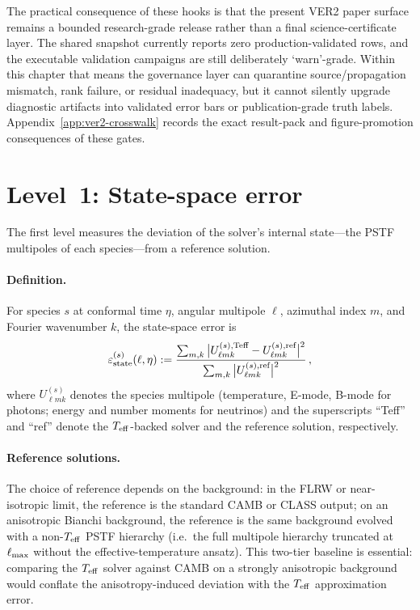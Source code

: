 The practical consequence of these hooks is that the present VER2 paper
surface remains a bounded research-grade release rather than a final
science-certificate layer.  The shared snapshot currently reports zero
production-validated rows, and the executable validation campaigns are
still deliberately `warn'-grade.  Within this chapter that means the
governance layer can quarantine source/propagation mismatch, rank
failure, or residual inadequacy, but it cannot silently upgrade
diagnostic artifacts into validated error bars or publication-grade
truth labels.  Appendix~\ref{app:ver2-crosswalk} records the exact
result-pack and figure-promotion consequences of these gates.


\section{Level~1: State-space error}
\label{sec:err-state}

The first level measures the deviation of the solver's
internal state---the PSTF multipoles of each species---from
a reference solution.


\paragraph{Definition.}

For species $s$ at conformal time $\eta$, angular multipole
$\ell$, azimuthal index $m$, and Fourier wavenumber $k$, the
state-space error is
\begin{equation}\label{eq:err-state}
\varepsilon_{\rm state}^{(s)}(\ell, \eta)
:= \frac{
  \sum_{m,k}
  \big|
    U_{\ell m k}^{(s),\text{Teff}}
    - U_{\ell m k}^{(s),\text{ref}}
  \big|^2
}{
  \sum_{m,k}
  \big|
    U_{\ell m k}^{(s),\text{ref}}
  \big|^2
}\,,
\end{equation}
where $U_{\ell m k}^{(s)}$ denotes the species multipole
(temperature, E-mode, B-mode for photons; energy and number
moments for neutrinos) and the superscripts ``Teff'' and
``ref'' denote the $T_{\mathrm{eff}}$-backed solver and the reference
solution, respectively.


\paragraph{Reference solutions.}

The choice of reference depends on the background:
in the FLRW or near-isotropic limit, the reference is
the standard CAMB or CLASS output; on an anisotropic
Bianchi background, the reference is the same background
evolved with a non-$T_{\mathrm{eff}}$ PSTF hierarchy (i.e.\ the full
multipole hierarchy truncated at $\ell_{\rm max}$ without
the effective-temperature ansatz).  This two-tier baseline
is essential: comparing the $T_{\mathrm{eff}}$ solver against CAMB on
a strongly anisotropic background would conflate the
anisotropy-induced deviation with the $T_{\mathrm{eff}}$
approximation error.


